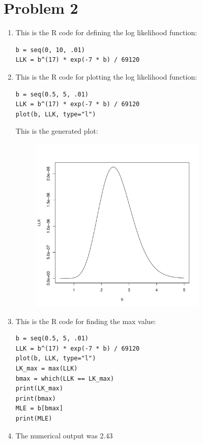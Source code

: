 \documentclass{article}
\begin{document}
\section*{Problem 2}
\begin{enumerate}
\item This is the R code for defining the log likelihood function: \\
\begin{verbatim}
b = seq(0, 10, .01)
LLK = b^(17) * exp(-7 * b) / 69120
\end{verbatim}
\item This is the R code for plotting the log likelihood function: \\
\begin{verbatim}
b = seq(0.5, 5, .01)
LLK = b^(17) * exp(-7 * b) / 69120
plot(b, LLK, type="l")
\end{verbatim}
This is the generated plot: \\
\begin{figure}[htbp]
    \centering
    \includegraphics[width=0.8\textwidth]{Rplots.pdf}
\end{figure}
\newpage
\item This is the R code for finding the max value: \\
\begin{verbatim}
b = seq(0.5, 5, .01)
LLK = b^(17) * exp(-7 * b) / 69120
plot(b, LLK, type="l")
LK_max = max(LLK)
bmax = which(LLK == LK_max)
print(LK_max)
print(bmax)
MLE = b[bmax]
print(MLE)
\end{verbatim}
\item The numerical output was 2.43
\end{enumerate}
\end{document}

